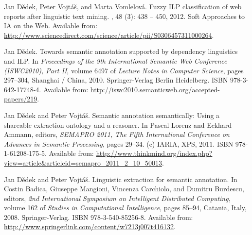 

\begin{description}


\item
Jan D{\v{e}}dek, Peter Vojt{\'{a}}{\v{s}}, and Marta Vomlelov{\'{a}}.
\newblock Fuzzy {ILP} classification of web reports after linguistic text
  mining.
, 48 (3):
  438 -- 450, 2012.
\newblock Soft Approaches to IA on the Web.
\newblock Available from:
  \url{http://www.sciencedirect.com/science/article/pii/S0306457311000264}.


\item
Jan D{\v{e}}dek.
\newblock Towards semantic annotation supported by dependency linguistics and
  {ILP}.
\newblock In {\em Proceedings of the 9th International Semantic Web Conference
  (ISWC2010), Part II}, volume 6497 of {\em Lecture Notes in Computer Science},
  pages 297--304, Shanghai / China, 2010. Springer-Verlag Berlin Heidelberg.
\newblock ISBN 978-3-642-17748-4.
\newblock Available from:
  \url{http://iswc2010.semanticweb.org/accepted-papers/219}.

\item
Jan D{\v{e}}dek and Peter Vojt{\'{a}}{\v{s}}.
\newblock Semantic annotation semantically: Using a shareable extraction
  ontology and a reasoner.
\newblock In Pascal Lorenz and Eckhard Ammann, editors, {\em {SEMAPRO 2011},
  The Fifth International Conference on Advances in Semantic Processing}, pages
  29--34. (c) {IARIA}, {XPS}, 2011.
\newblock ISBN 978-1-61208-175-5.
\newblock Available from:
  \url{http://www.thinkmind.org/index.php?view=article&articleid=semapro_2011_2_10_50013}.



\item
Jan D{\v{e}}dek and Peter Vojt{\'{a}}{\v{s}}.
\newblock Linguistic extraction for semantic annotation.
\newblock In Costin Badica, Giuseppe Mangioni, Vincenza Carchiolo, and Dumitru
  Burdescu, editors, {\em 2nd International Symposium on Intelligent
  Distributed Computing}, volume 162 of {\em Studies in Computational
  Intelligence}, pages 85--94, Catania, Italy, 2008. Springer-Verlag.
\newblock ISBN 978-3-540-85256-8.
\newblock Available from:
  \url{http://www.springerlink.com/content/w7213j007t416132}.



\end{description}
